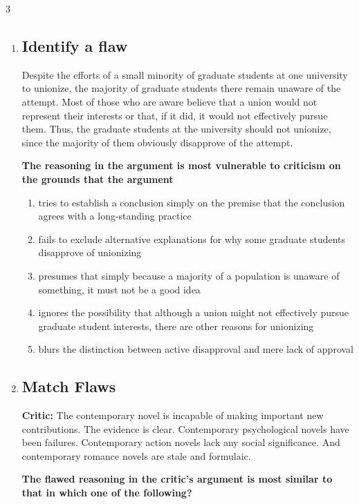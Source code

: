 \documentclass[9pt]{article}
\begin{document}
\begin{multicols}{3}
\begin{enumerate}
\item
\subsection*{Identify a flaw}
\noindent
Despite the efforts of a small minority of graduate students at one university to unionize, the majority of graduate students there remain unaware of the attempt. Most of those who are aware believe that a union would not represent their interests or that, if it did, it would not effectively pursue them. Thus, the graduate students at the university should not unionize, since the majority of them obviously disapprove of the attempt.

 

\noindent
\textbf{The reasoning in the argument is most vulnerable to criticism on the grounds that the argument}

\begin{enumerate}[label=(\alph*)]
    \item tries to establish a conclusion simply on the premise that the conclusion agrees with a long-standing practice
    \item fails to exclude alternative explanations for why some graduate students disapprove of unionizing
    \item presumes that simply because a majority of a population is unaware of something, it must not be a good idea
    \item ignores the possibility that although a union might not effectively pursue graduate student interests, there are other reasons for unionizing
    \item blurs the distinction between active disapproval and mere lack of approval
\end{enumerate}

\item
\subsection*{Match Flaws}

\noindent
\textbf{Critic:} The contemporary novel is incapable of making important new contributions. The evidence is clear. Contemporary psychological novels have been failures. Contemporary action novels lack any social significance. And contemporary romance novels are stale and formulaic.

 

\noindent
\textbf{The flawed reasoning in the critic's argument is most similar to that in which one of the following?}


\end{enumerate}
\end{multicols}
\end{document}
